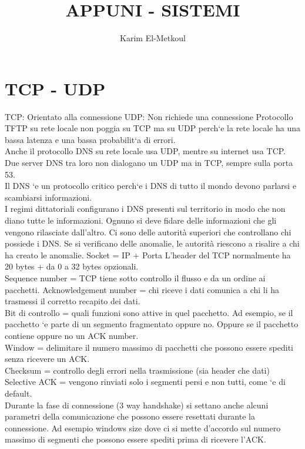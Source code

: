 \documentclass{article}
\title{APPUNI - SISTEMI}
\author{Karim El-Metkoul  }
\begin{document}
\maketitle

\section{TCP - UDP}
TCP: Orientato alla connessione UDP: Non richiede una connessione
Protocollo TFTP su rete locale non poggia su TCP ma su UDP perch`e la
rete locale ha una bassa latenza e una bassa probabilit`a di errori.
\\

Anche il protocollo DNS su rete locale usa UDP, mentre su internet usa
TCP. Due server DNS tra loro non dialogano un UDP ma in TCP, sempre sulla
porta 53.
\\
Il DNS `e un protocollo critico perch`e i DNS di tutto il mondo devono parlarsi
e scambiarsi informazioni. \\I regimi dittatoriali configurano i DNS presenti sul
territorio in modo che non diano tutte le informazioni.
Ognuno si deve fidare delle informazioni che gli vengono rilasciate dall'altro.
Ci sono delle autorità superiori che controllano chi possiede i DNS. Se si verificano delle anomalie, le autorità riescono a risalire a chi ha creato le anomalie.
Socket = IP + Porta L’header del TCP normalmente ha 20 bytes + da 0 a
32 bytes opzionali.\\
Sequence number = TCP tiene sotto controllo il flusso e da un ordine ai
pacchetti. Acknowledgement number = chi riceve i dati comunica a chi li ha
trasmessi il corretto recapito dei dati.\\
Bit di controllo = quali funzioni sono attive in quel pacchetto. Ad esempio,
se il pacchetto `e parte di un segmento fragmentato oppure no. Oppure se il
pacchetto contiene oppure no un ACK number.\\
Window = delimitare il numero massimo di pacchetti che possono essere
spediti senza ricevere un ACK.\\
Checksum = controllo degli errori nella trasmissione (sia header che dati)
Selective ACK = vengono rinviati solo i segmenti persi e non tutti, come `e
di default.\\
Durante la fase di connessione (3 way handshake) si settano anche alcuni
parametri della comunicazione che possono essere resettati durante la connessione. Ad esempio windows size dove ci si mette d’accordo sul numero massimo
di segmenti che possono essere spediti prima di ricevere l’ACK.
\end{document}
